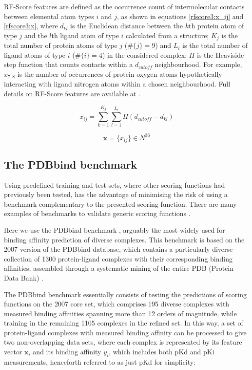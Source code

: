 RF-Score features are defined as the occurrence count of intermolecular contacts between elemental atom types $i$ and $j$, as shown in equations \eqref{rfscore3:x_ij} and \eqref{rfscore3:x}, where $d_{kl}$ is the Euclidean distance between the $k$th protein atom of type $j$ and the $l$th ligand atom of type $i$ calculated from a structure; $K_j$ is the total number of protein atoms of type $j$ ($\#\{j\}=9$) and $L_i$ is the total number of ligand atoms of type $i$ ($\#\{i\}=4$) in the considered complex; $H$ is the Heaviside step function that counts contacts within a $d_{cutoff}$ neighbourhood. For example, $x_{7,8}$ is the number of occurrences of protein oxygen atoms hypothetically interacting with ligand nitrogen atoms within a chosen neighbourhood. Full details on RF-Score features are available at \citep{564,1295}.

\begin{equation}
\label{rfscore3:x_ij}
x_{ij}=\sum_{k=1}^{K_j}\sum_{l=1}^{L_i}H(d_{cutoff}-d_{kl})
\end{equation}

\begin{equation}
\label{rfscore3:x}
\mathbf x=\{x_{ij}\}\in N^{36}
\end{equation}

\subsection{The PDBbind benchmark}

Using predefined training and test sets, where other scoring functions had previously been tested, has the advantage of minimising the risk of using a benchmark complementary to the presented scoring function. There are many examples of benchmarks to validate generic scoring functions \citep{1455,1456,571,1457}.

Here we use the PDBbind benchmark \citep{1313}, arguably the most widely used for binding affinity prediction of diverse complexes. This benchmark is based on the 2007 version of the PDBbind database, which contains a particularly diverse collection of 1300 protein-ligand complexes with their corresponding binding affinities, assembled through a systematic mining of the entire PDB (Protein Data Bank) \citep{540,537}.

The PDBbind benchmark essentially consists of testing the predictions of scoring functions on the 2007 core set, which comprises 195 diverse complexes with measured binding affinities spanning more than 12 orders of magnitude, while training in the remaining 1105 complexes in the refined set. In this way, a set of protein-ligand complexes with measured binding affinity can be processed to give two non-overlapping data sets, where each complex is represented by its feature vector $\mathbf x_i$ and its binding affinity $y_i$, which includes both pKd and pKi measurements, henceforth referred to as just pKd for simplicity:

